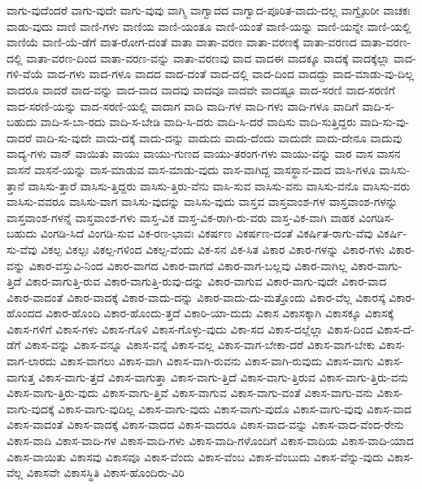 {ವಾಗು-ವುದೆಂದರೆ
ವಾಗು-ವುದೇ
ವಾಗು-ವುವು
ವಾಗ್ಮಿ
ವಾಗ್ವಾದದ
ವಾಗ್ವಾದ-ಪೂರಿತ-ವಾದು-ದಲ್ಲ
ವಾಗ್ವೈಖರೀ
ವಾಚಕಃ
ವಾಡು-ವುದು
ವಾಣಿ
ವಾಣಿ-ಗಳು
ವಾಣಿಯ
ವಾಣಿ-ಯಂತೂ
ವಾಣಿ-ಯಂತೆ
ವಾಣಿ-ಯನ್ನು
ವಾಣಿ-ಯನ್ನೇ
ವಾಣಿ-ಯಲ್ಲಿ
ವಾಣಿಯೆ
ವಾಣಿ-ಯೆ-ಡೆಗೆ
ವಾತ-ರೋಗ-ದಂತೆ
ವಾತಾ
ವಾತಾ-ವರಣ
ವಾತಾ-ವರಣಕ್ಕೆ
ವಾತಾ-ವರಣದ
ವಾತಾ-ವರಣ-ದಲ್ಲಿ
ವಾತಾ-ವರಣ-ದಿಂದ
ವಾತಾ-ವರಣ-ವನ್ನು
ವಾತಾ-ವರಣವು
ವಾದ
ವಾದಈ
ವಾದಕ್ಕೂ
ವಾದಕ್ಕೆ
ವಾದಕ್ಕೆಲ್ಲಾ
ವಾದ-ಗಳಿ-ವೆಯೆ
ವಾದ-ಗಳು
ವಾದ-ಗಳೂ
ವಾದದ
ವಾದ-ದಂತೆ
ವಾದ-ದಲ್ಲಿ
ವಾದ-ದಿಂದ
ವಾದದ್ದು
ವಾದ-ಮಾಡು-ವು-ದಿಲ್ಲ
ವಾದರೂ
ವಾದರೆ
ವಾದ-ವನ್ನು
ವಾದ-ವಾದ
ವಾದವು
ವಾದವೂ
ವಾದವೇ
ವಾದಷ್ಟೂ
ವಾದ-ಸರಣಿ
ವಾದ-ಸರಣಿಗೆ
ವಾದ-ಸರಣಿ-ಯನ್ನು
ವಾದ-ಸರಣಿ-ಯಲ್ಲಿ
ವಾದಾಗ
ವಾದಿ
ವಾದಿ-ಗಳ
ವಾದಿ-ಗಳು
ವಾದಿ-ಗಳೂ
ವಾದಿಗೆ
ವಾದಿ-ಸ-ಬಹುದು
ವಾದಿ-ಸ-ಬಾ-ರದು
ವಾದಿ-ಸ-ಬೇಡಿ
ವಾದಿ-ಸಿ-ದರು
ವಾದಿ-ಸಿ-ದರೆ
ವಾದಿಸು
ವಾದಿ-ಸುತ್ತಿದ್ದರು
ವಾದಿ-ಸು-ವು-ದಾದರೆ
ವಾದಿ-ಸು-ವುದೇ
ವಾದು-ದಕ್ಕೆ
ವಾದು-ದನ್ನು
ವಾದುದು
ವಾದು-ದೆಂದು
ವಾದುದೇ
ವಾದು-ದೇನೂ
ವಾದುವು
ವಾದ್ಯ-ಗಳು
ವಾನ್
ವಾಯಿತು
ವಾಯು
ವಾಯು-ಗುಣದ
ವಾಯು-ತರಂಗ-ಗಳು
ವಾಯು-ವನ್ನು
ವಾರ
ವಾಸ
ವಾಸನ
ವಾಸನೆ
ವಾಸನೆ-ಯನ್ನು
ವಾಸ-ಮಾಡುವ
ವಾಸ-ಮಾಡು-ವುದು
ವಾಸ-ವಾಗಿದ್ದ
ವಾಸಸ್ಥಾನ-ವಾದ
ವಾಸಿ-ಗಳೂ
ವಾಸಿಸು-ತ್ತಾನೆ
ವಾಸಿಸು-ತ್ತಾರೆ
ವಾಸಿಸು-ತ್ತಿದ್ದರು
ವಾಸಿಸು-ತ್ತಿರು-ವೆನು
ವಾಸಿ-ಸುವ
ವಾಸಿಸು-ವನು
ವಾಸಿಸು-ವನೊ
ವಾಸಿಸು-ವರು
ವಾಸಿಸು-ವವರೂ
ವಾಸಿಸು-ವಾಗ
ವಾಸಿಸು-ವುದನ್ನು
ವಾಸಿಸು-ವುದು
ವಾಸ್ತವ
ವಾಸ್ತವಾಂಶ-ಗಳ
ವಾಸ್ತವಾಂಶ-ಗಳನ್ನು
ವಾಸ್ತವಾಂಶ-ಗಳನ್ನೆ
ವಾಸ್ತವಾಂಶ-ಗಳು
ವಾಸ್ತ-ವಿಕ
ವಾಸ್ತ-ವಿಕ-ರಾಗಿ-ರು-ವರು
ವಾಸ್ತ-ವಿಕ-ವಾಗಿ
ವಾಹಕ
ವಿಂಗಡಿಸ-ಬಹುದು
ವಿಂಗಡಿ-ಸಿದೆ
ವಿಂಗಡಿ-ಸುವ
ವಿಕ-ರಣ-ಭಾವಃ
ವಿಕರ್ಷಣ
ವಿಕರ್ಷಣ-ದಂತೆ
ವಿಕರ್ಷಿತ-ರಾಗು-ವೆವು
ವಿಕರ್ಷಿ-ಸು-ವೆವು
ವಿಕಲ್ಪ
ವಿಕಲ್ಪಃ
ವಿಕಲ್ಪ-ಗಳಿಂದ
ವಿಕಲ್ಪ-ವೆಂದು
ವಿಕ-ಸನ
ವಿಕ-ಸಿತ
ವಿಕಾರ
ವಿಕಾರ-ಗಳನ್ನು
ವಿಕಾರ-ಗಳು
ವಿಕಾರ-ವನ್ನು
ವಿಕಾರ-ವಸ್ತುವಿ-ನಿಂದ
ವಿಕಾರ-ವಾಗದ
ವಿಕಾರ-ವಾಗದೆ
ವಿಕಾರ-ವಾಗ-ಬಲ್ಲವು
ವಿಕಾರ-ವಾಗಿಲ್ಲ
ವಿಕಾರ-ವಾಗು-ತ್ತಿದೆ
ವಿಕಾರ-ವಾಗುತ್ತಿ-ರುವ
ವಿಕಾರ-ವಾಗುತ್ತಿ-ರುವು-ದನ್ನು
ವಿಕಾರ-ವಾಗುವ
ವಿಕಾರ-ವಾಗು-ವುದೇ
ವಿಕಾರ-ವಾದ
ವಿಕಾರ-ವಾದಂತೆ
ವಿಕಾರ-ವಾದಕ್ಕೆ
ವಿಕಾರ-ವಾದು-ದನ್ನು
ವಿಕಾರ-ವಾದು-ದು-ಮತ್ತೊಂದು
ವಿಕಾರ-ವೆಲ್ಲ
ವಿಕಾರಸ್ಕೆ
ವಿಕಾರ-ಹೊಂದದ
ವಿಕಾರ-ಹೊಂದಿ
ವಿಕಾರ-ಹೊಂದು-ತ್ತದೆ
ವಿಕಾರಿ-ಯಾ-ದುದು
ವಿಕಾಸ
ವಿಕಾಸಕ್ಕಾಗಿ
ವಿಕಾಸಕ್ಕೂ
ವಿಕಾಸಕ್ಕೆ
ವಿಕಾಸ-ಗಳಿಗೆ
ವಿಕಾಸ-ಗಳು
ವಿಕಾಸ-ಗೊಳಿ
ವಿಕಾಸ-ಗೊಳ್ಳು-ವುದು
ವಿಕಾ-ಸದ
ವಿಕಾಸ-ದಲ್ಲೆಲ್ಲಾ
ವಿಕಾಸ-ದಿಂದ
ವಿಕಾಸ-ದೆ-ಡೆಗೆ
ವಿಕಾಸ-ವನ್ನು
ವಿಕಾಸ-ವನ್ನೂ
ವಿಕಾಸ-ವನ್ನೆ
ವಿಕಾಸ-ವಲ್ಲ
ವಿಕಾಸ-ವಾಗ-ಬೇಕಾ-ದರೆ
ವಿಕಾಸ-ವಾಗ-ಬೇಕು
ವಿಕಾಸ-ವಾಗ-ಲಾರದು
ವಿಕಾಸ-ವಾಗಲು
ವಿಕಾಸ-ವಾಗಿ
ವಿಕಾಸ-ವಾಗಿ-ರುವನು
ವಿಕಾಸ-ವಾಗಿ-ರುವುದು
ವಿಕಾಸ-ವಾಗು
ವಿಕಾಸ-ವಾಗುತ್ತ
ವಿಕಾಸ-ವಾಗು-ತ್ತದೆ
ವಿಕಾಸ-ವಾಗುತ್ತಾ
ವಿಕಾಸ-ವಾಗು-ತ್ತಿದೆ
ವಿಕಾಸ-ವಾಗು-ತ್ತಿರುವ
ವಿಕಾಸ-ವಾಗು-ತ್ತಿರು-ವನು
ವಿಕಾಸ-ವಾಗು-ತ್ತಿರು-ವುದು
ವಿಕಾಸ-ವಾಗು-ತ್ತಿವೆ
ವಿಕಾಸ-ವಾಗುವ
ವಿಕಾಸ-ವಾಗು-ವಂತೆ
ವಿಕಾಸ-ವಾಗು-ವನು
ವಿಕಾಸ-ವಾಗು-ವುದಕ್ಕೆ
ವಿಕಾಸ-ವಾಗು-ವುದಿಲ್ಲ
ವಿಕಾಸ-ವಾಗು-ವುದು
ವಿಕಾಸ-ವಾಗು-ವುದೊ
ವಿಕಾಸ-ವಾಗು-ವುವು
ವಿಕಾಸ-ವಾದ
ವಿಕಾಸ-ವಾದಂತೆ
ವಿಕಾಸ-ವಾದಕ್ಕೆ
ವಿಕಾಸ-ವಾದದ
ವಿಕಾಸ-ವಾದರೂ
ವಿಕಾಸ-ವಾದ-ವನ್ನು
ವಿಕಾಸ-ವಾದ-ವೆಂದ-ರೇನು
ವಿಕಾಸ-ವಾದಿ
ವಿಕಾಸ-ವಾದಿ-ಗಳ
ವಿಕಾಸ-ವಾದಿ-ಗಳು
ವಿಕಾಸ-ವಾದಿ-ಗಳೊಂದಿಗೆ
ವಿಕಾಸ-ವಾದಿಯ
ವಿಕಾಸ-ವಾದಿ-ಯಾದ
ವಿಕಾಸ-ವಾಯಿತು
ವಿಕಾಸವು
ವಿಕಾಸವೂ
ವಿಕಾಸ-ವೆಂದು
ವಿಕಾಸ-ವೆಂಬ
ವಿಕಾಸ-ವೆಂಬುದು
ವಿಕಾಸ-ವೆನ್ನು-ವುದು
ವಿಕಾಸ-ವೆಲ್ಲ
ವಿಕಾಸವೇ
ವಿಕಾಸಸ್ಥಿತಿ
ವಿಕಾಸ-ಹೊಂದಿರು-ವಿರಿ
}
